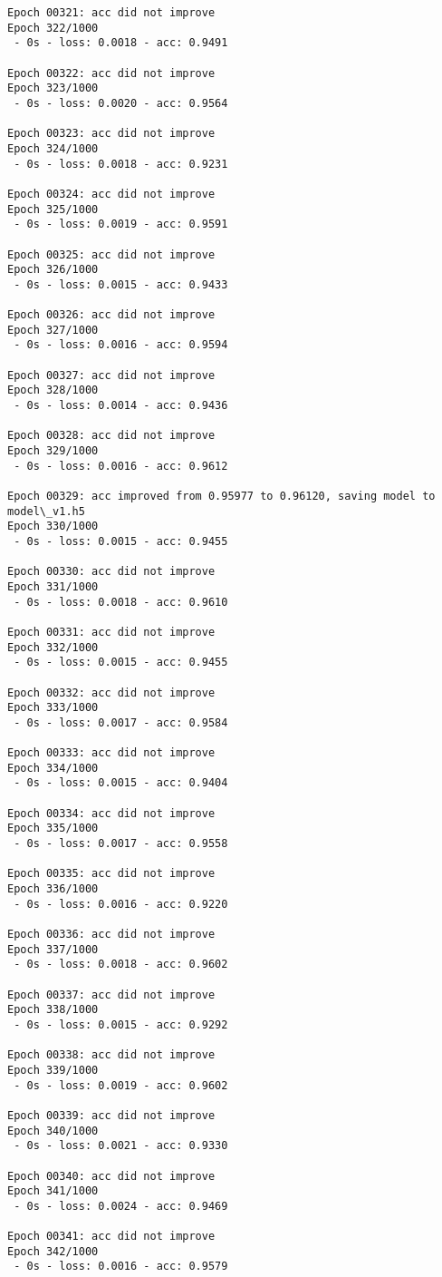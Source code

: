 \documentclass[11pt]{article}
\begin{document}
\begin{Verbatim}[commandchars=\\\{\}]
Epoch 00321: acc did not improve
Epoch 322/1000
 - 0s - loss: 0.0018 - acc: 0.9491

Epoch 00322: acc did not improve
Epoch 323/1000
 - 0s - loss: 0.0020 - acc: 0.9564

Epoch 00323: acc did not improve
Epoch 324/1000
 - 0s - loss: 0.0018 - acc: 0.9231

Epoch 00324: acc did not improve
Epoch 325/1000
 - 0s - loss: 0.0019 - acc: 0.9591

Epoch 00325: acc did not improve
Epoch 326/1000
 - 0s - loss: 0.0015 - acc: 0.9433

Epoch 00326: acc did not improve
Epoch 327/1000
 - 0s - loss: 0.0016 - acc: 0.9594

Epoch 00327: acc did not improve
Epoch 328/1000
 - 0s - loss: 0.0014 - acc: 0.9436

Epoch 00328: acc did not improve
Epoch 329/1000
 - 0s - loss: 0.0016 - acc: 0.9612

Epoch 00329: acc improved from 0.95977 to 0.96120, saving model to model\_v1.h5
Epoch 330/1000
 - 0s - loss: 0.0015 - acc: 0.9455

Epoch 00330: acc did not improve
Epoch 331/1000
 - 0s - loss: 0.0018 - acc: 0.9610

Epoch 00331: acc did not improve
Epoch 332/1000
 - 0s - loss: 0.0015 - acc: 0.9455

Epoch 00332: acc did not improve
Epoch 333/1000
 - 0s - loss: 0.0017 - acc: 0.9584

Epoch 00333: acc did not improve
Epoch 334/1000
 - 0s - loss: 0.0015 - acc: 0.9404

Epoch 00334: acc did not improve
Epoch 335/1000
 - 0s - loss: 0.0017 - acc: 0.9558

Epoch 00335: acc did not improve
Epoch 336/1000
 - 0s - loss: 0.0016 - acc: 0.9220

Epoch 00336: acc did not improve
Epoch 337/1000
 - 0s - loss: 0.0018 - acc: 0.9602

Epoch 00337: acc did not improve
Epoch 338/1000
 - 0s - loss: 0.0015 - acc: 0.9292

Epoch 00338: acc did not improve
Epoch 339/1000
 - 0s - loss: 0.0019 - acc: 0.9602

Epoch 00339: acc did not improve
Epoch 340/1000
 - 0s - loss: 0.0021 - acc: 0.9330

Epoch 00340: acc did not improve
Epoch 341/1000
 - 0s - loss: 0.0024 - acc: 0.9469

Epoch 00341: acc did not improve
Epoch 342/1000
 - 0s - loss: 0.0016 - acc: 0.9579


\end{Verbatim}
\end{document}
